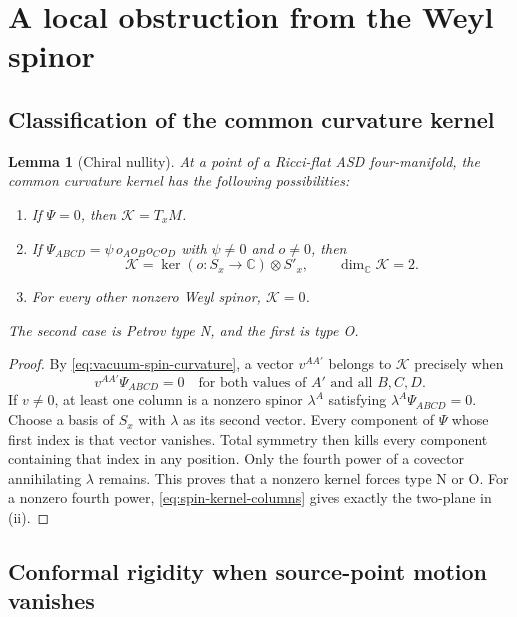 \documentclass[11pt]{article}
\numberwithin{equation}{section}
\newtheorem{lemma}[theorem]{Lemma}
\theoremstyle{definition}
\theoremstyle{remark}
\newcommand{\C}{\mathbb C}
\newcommand{\calK}{\mathcal K}
\begin{document}
\section{A local obstruction from the Weyl spinor}\label{sec:obstruction}

\subsection{Classification of the common curvature kernel}

\begin{lemma}[Chiral nullity]\label{lem:spin-nullity}
At a point of a Ricci-flat ASD four-manifold, the common curvature kernel has the following possibilities:
\begin{enumerate}[label=\textup{(\roman*)},leftmargin=*]
\item If $\Psi=0$, then $\calK=T_xM$.
\item If $\Psi_{ABCD}=\psi\,o_Ao_Bo_Co_D$ with $\psi\ne0$ and $o\ne0$, then
\[
\calK=\ker(o:S_x\to\C)\otimes S'_x,
\qquad \dim_\C\calK=2.
\]
\item For every other nonzero Weyl spinor, $\calK=0$.
\end{enumerate}
The second case is Petrov type N, and the first is type O.
\end{lemma}
\begin{proof}
By \eqref{eq:vacuum-spin-curvature}, a vector $v^{AA'}$ belongs to $\calK$ precisely when
\begin{equation}\label{eq:spin-kernel-columns}
v^{AA'}\Psi_{ABCD}=0
\quad\text{for both values of }A'\text{ and all }B,C,D.
\end{equation}
If $v\ne0$, at least one column is a nonzero spinor $\lambda^A$ satisfying $\lambda^A\Psi_{ABCD}=0$. Choose a basis of $S_x$ with $\lambda$ as its second vector. Every component of $\Psi$ whose first index is that vector vanishes. Total symmetry then kills every component containing that index in any position. Only the fourth power of a covector annihilating $\lambda$ remains. This proves that a nonzero kernel forces type N or O. For a nonzero fourth power, \eqref{eq:spin-kernel-columns} gives exactly the two-plane in (ii).
\end{proof}

\subsection{Conformal rigidity when source-point motion vanishes}
\end{document}
